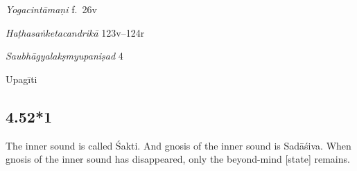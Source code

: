 \begin{ekdosis}

\begin{testimonia}[hp04_052]
\emph{Yogacintāmaṇi} f.~26v
\begin{versinnote}
\end{versinnote}

\emph{Haṭhasaṅketacandrikā} 123v–124r
\begin{versinnote}
\end{versinnote}

\emph{Saubhāgyalakṣmyupaniṣad} 4
\begin{versinnote}
\end{versinnote}
\end{testimonia}

\begin{philcomm}[hp04_052]
\end{philcomm}

\begin{metre}[hp04_052]
Upagīti 
\end{metre}

\subsection*{4.52*1}
\begin{translation}[hp04_052_1]
The inner sound is called Śakti. And gnosis of the inner sound is Sadāśiva. When gnosis of the inner sound has disappeared, only the beyond-mind [state] remains.
\end{translation}
%


\end{ekdosis}
